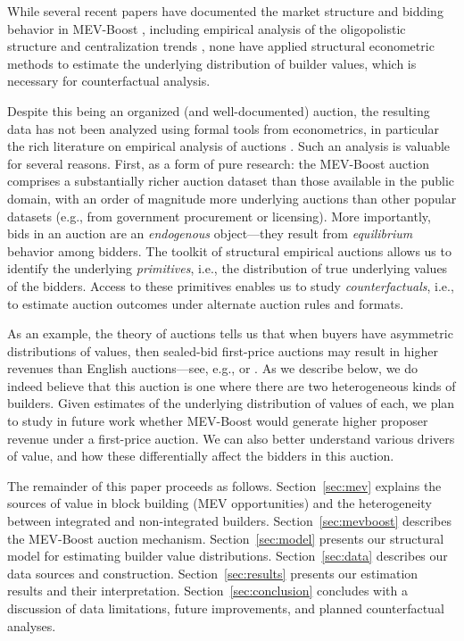 \documentclass[12pt,reqno]{amsart}
\begin{document}
While several recent papers have documented the market structure and bidding behavior in MEV-Boost \citep{gupta2023centralizing, wahrstätter2023time, oz2024who, wu2024strategic}, including empirical analysis of the oligopolistic structure and centralization trends \citep{wu2024centralization}, none have applied structural econometric methods to estimate the underlying distribution of builder values, which is necessary for counterfactual analysis. 

Despite this being an organized (and well-documented) auction, the resulting data has not been analyzed using formal tools from econometrics, in particular the rich literature on empirical analysis of auctions \citep{athey2002identification,haile2003inference,hendricks2007empirical,hortaccsu2021empirical}. Such an analysis is valuable for several reasons. First, as a form of pure research: the MEV-Boost auction comprises a substantially richer auction dataset than those available in the public domain, with an order of magnitude more underlying auctions than other popular datasets (e.g., from government procurement or licensing). More importantly, bids in an auction are an \emph{endogenous} object---they result from \emph{equilibrium} behavior among bidders. The toolkit of structural empirical auctions allows us to identify the underlying \emph{primitives}, i.e., the distribution of true underlying values of the bidders. Access to these primitives enables us to study \emph{counterfactuals}, i.e., to estimate auction outcomes under alternate auction rules and formats. 

As an example, the theory of auctions tells us that when buyers have asymmetric distributions of values, then sealed-bid first-price auctions may result in higher revenues than English auctions---see, e.g., \cite{10.1111/1467-937X.00137} or \cite{kirkegaard2012mechanism}. As we describe below, we do indeed believe that this auction is one where there are two heterogeneous kinds of builders. Given estimates of the underlying distribution of values of each, we plan to study in future work whether MEV-Boost would generate higher proposer revenue under a first-price auction. We can also better understand various drivers of value, and how these differentially affect the bidders in this auction. 

The remainder of this paper proceeds as follows. Section~\ref{sec:mev} explains the sources of value in block building (MEV opportunities) and the heterogeneity between integrated and non-integrated builders. Section~\ref{sec:mevboost} describes the MEV-Boost auction mechanism. Section~\ref{sec:model} presents our structural model for estimating builder value distributions. Section~\ref{sec:data} describes our data sources and construction. Section~\ref{sec:results} presents our estimation results and their interpretation. Section~\ref{sec:conclusion} concludes with a discussion of data limitations, future improvements, and planned counterfactual analyses.
\end{document}

